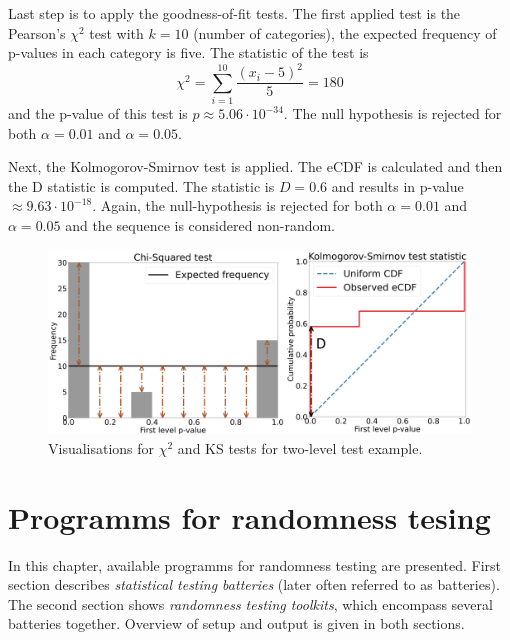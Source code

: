 \documentclass[
  digital,     %
  oneside,     %
  nosansbold,  %
  nocolorbold, %
  nolof,         %
  nolot,         %
]{fithesis4}
\begin{document}
Last step is to apply the goodness-of-fit tests. The first applied test is the Pearson's $\chi^2$ test with $k=10$ (number of categories), the expected frequency of p-values in each category is five. The statistic of the test is
\[\chi^2 = \sum_{i=1}^{10} \dfrac{(x_i - 5)^2}{5} = 180 \]
and the p-value of this test is $p\approx5.06\cdot10^{-34}$. The null hypothesis is rejected for both $\alpha = 0.01$ and $\alpha = 0.05$. 

Next, the Kolmogorov-Smirnov test is applied. The eCDF is calculated and then the D statistic is computed. The statistic is $D = 0.6$ and results in p-value $\approx 9.63\cdot10^{-18}$. Again, the null-hypothesis is rejected for both $\alpha = 0.01$ and $\alpha = 0.05$ and the sequence is considered non-random.

\begin{figure}
  \begin{center}
    \includegraphics[width=12.5cm]{figures/two_example.png}
  \end{center}
  \caption{Visualisations for $\chi^2$ and KS tests for two-level test example.}
  \label{fig:two_example}
\end{figure}


\chapter{Programms for randomness tesing}
In this chapter, available programms for randomness testing are presented. First section describes \emph{statistical testing batteries} (later often referred to as batteries).  The second section shows \emph{randomness testing toolkits}, which encompass several batteries together. Overview of setup and output is given in both sections.
\end{document}
